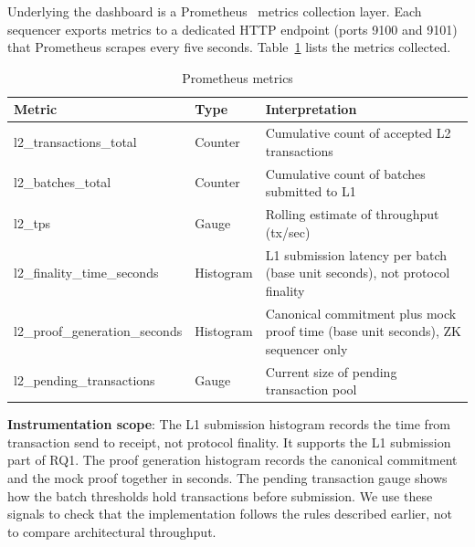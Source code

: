 Underlying the dashboard is a Prometheus~\cite{prometheus2024} metrics collection layer. Each sequencer exports metrics to a dedicated HTTP endpoint (ports 9100 and 9101) that Prometheus scrapes every five seconds. Table~\ref{tab:metrics-exported} lists the metrics collected.

\begin{table}[htbp]
    \centering
    \footnotesize
    \setlength{\tabcolsep}{3pt}
    \renewcommand{\arraystretch}{1.08}
    \begin{tabular}{@{}>{\raggedright\arraybackslash\ttfamily}p{5.2cm}|>{\raggedright\arraybackslash}p{2.0cm}|>{\raggedright\arraybackslash}p{6.4cm}@{}}
        \hline
        \normalfont\textbf{Metric} & \textbf{Type} & \textbf{Interpretation} \\
        \hline
        l2\_\allowbreak transactions\_\allowbreak total & Counter & Cumulative count of accepted L2 transactions \\
        \hline
        l2\_\allowbreak batches\_\allowbreak total & Counter & Cumulative count of batches submitted to L1 \\
        \hline
        l2\_\allowbreak tps & Gauge & Rolling estimate of throughput (tx/sec) \\
        \hline
        l2\_\allowbreak finality\_\allowbreak time\_\allowbreak seconds & Histogram & L1 submission latency per batch (base unit seconds), not protocol finality \\
        \hline
        l2\_\allowbreak proof\_\allowbreak generation\_\allowbreak seconds & Histogram & Canonical commitment plus mock proof time (base unit seconds), ZK sequencer only \\
        \hline
        l2\_\allowbreak pending\_\allowbreak transactions & Gauge & Current size of pending transaction pool \\
        \hline
    \end{tabular}
    \caption{Prometheus metrics}
    \label{tab:metrics-exported}
\end{table}

\textbf{Instrumentation scope}: The L1 submission histogram records the time from transaction send to receipt, not protocol finality. It supports the L1 submission part of RQ1. The proof generation histogram records the canonical commitment and the mock proof together in seconds. The pending transaction gauge shows how the batch thresholds hold transactions before submission. We use these signals to check that the implementation follows the rules described earlier, not to compare architectural throughput.

